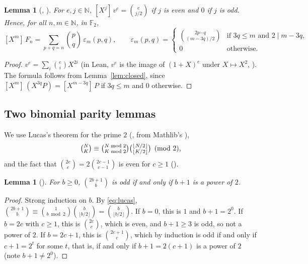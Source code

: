 \documentclass[11pt]{amsart}
\theoremstyle{plain}
\newtheorem{lemma}[theorem]{Lemma}
\theoremstyle{definition}
\newcommand{\F}{\mathbb{F}_2}
\newcommand{\N}{\mathbb{N}}
\newcommand{\tsub}{\mathbin{\dot{-}}}
\newcommand{\co}[2]{[X^{#1}]\,#2}
\begin{document}
\begin{lemma}[, ]\label{lem:fcoeff}
For $e,j\in\N$, $\co{j}{v^e}=\binom{e}{j/2}$ if $j$ is even and $0$ if $j$ is odd. Hence, for all $n,m\in\N$, in $\F$,
\begin{equation}\label{eq:coeff}
  \co{m}{F_n}=\sum_{p+q=n}\binom pq\,\varepsilon_m(p,q),\qquad
  \varepsilon_m(p,q)=\begin{cases}\binom{2p\tsub q}{(m-3q)/2}&\text{if }3q\le m\text{ and }2\mid m-3q,\\ 0&\text{otherwise.}\end{cases}
\end{equation}
\end{lemma}

\begin{proof}
$v^e=\sum_i\binom eiX^{2i}$ (in Lean, $v^e$ is the image of $(1+X)^e$ under $X\mapsto X^2$, ). The formula follows from Lemma~\ref{lem:closed}, since $\co{m}{(X^{3q}P)}=\co{m-3q}{P}$ if $3q\le m$ and $0$ otherwise.
\end{proof}

\subsection{Two binomial parity lemmas}
We use Lucas's theorem \cite{Lucas} for the prime $2$ (, from Mathlib's ),
\begin{equation}\label{eq:lucas}
  \tbinom NK\equiv\tbinom{N\bmod2}{K\bmod2}\tbinom{\lfloor N/2\rfloor}{\lfloor K/2\rfloor}\pmod 2,
\end{equation}
and the fact that $\binom{2c}{c}=2\binom{2c-1}{c-1}$ is even for $c\ge1$ ().

\begin{lemma}[]\label{lem:oddC}
For $b\ge0$, $\binom{2b+1}{b}$ is odd if and only if $b+1$ is a power of $2$.
\end{lemma}

\begin{proof}
Strong induction on $b$. By \eqref{eq:lucas}, $\binom{2b+1}{b}\equiv\binom{1}{b\bmod2}\binom{b}{\lfloor b/2\rfloor}=\binom{b}{\lfloor b/2\rfloor}$.
If $b=0$, this is $1$ and $b+1=2^0$.
If $b=2c$ with $c\ge1$, this is $\binom{2c}{c}$, which is even, and $b+1\ge3$ is odd, so not a power of $2$.
If $b=2c+1$, this is $\binom{2c+1}{c}$, which by induction is odd if and only if $c+1=2^t$ for some $t$, that is, if and only if $b+1=2(c+1)$ is a power of $2$ (note $b+1\ne 2^0$).
\end{proof}
\end{document}
